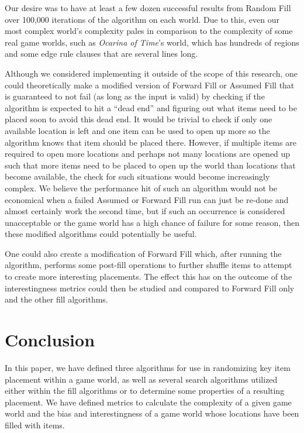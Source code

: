\documentclass{ieeeaccess}
\begin{document}
Our desire was to have at least a few dozen successful results from Random Fill over 100,000
iterations of the algorithm on each world. Due to this, even our most complex world’s
complexity pales in comparison to the complexity of some real game worlds, such as
\textit{Ocarina of Time}’s world, which has hundreds of regions and some edge rule clauses that
are several lines long.

Although we considered implementing it outside of the scope of this research, one could
theoretically make a modified version of Forward Fill or Assumed Fill that is guaranteed to not
fail (as long as the input is valid) by checking if the algorithm is expected to hit a “dead
end” and figuring out what items need to be placed soon to avoid this dead end. It would be
trivial to check if only one available location is left and one item can be used to open up
more so the algorithm knows that item should be placed there. However, if multiple items are
required to open more locations and perhaps not many locations are opened up such that more
items need to be placed to open up the world than locations that become available, the check
for such situations would become increasingly complex. We believe the performance hit of such
an algorithm would not be economical when a failed Assumed or Forward Fill run can just be
re-done and almost certainly work the second time, but if such an occurrence is considered
unacceptable or the game world has a high chance of failure for some reason, then these
modified algorithms could potentially be useful.

One could also create a modification of Forward Fill which, after running the algorithm, 
performs some post-fill operations to further shuffle items to attempt to create more 
interesting placements. The effect this has on the outcome of the interestingness metrics
could then be studied and compared to Forward Fill only and the other fill algorithms.

\section{Conclusion}
In this paper, we have defined three algorithms for use in randomizing key item placement
within a game world, as well as several search algorithms utilized either within the fill
algorithms or to determine some properties of a resulting placement. We have defined metrics to
calculate the complexity of a given game world and the bias and interestingness of a game world
whose locations have been filled with items.
\end{document}
